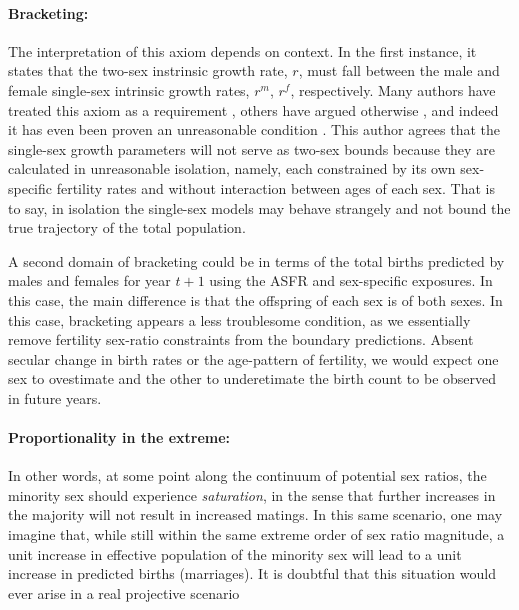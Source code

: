 \paragraph{Bracketing:} The interpretation of this axiom depends on context.
In the first instance, it states that the two-sex instrinsic growth rate, $r$,
must fall between the male and female single-sex intrinsic growth rates, $r^m$, $r^f$, 
respectively. Many authors have treated this axiom as a requirement
\citep{pollard1948measurement,
coale1972growth, gupta1976interactive, mitra1978derivation}, others have
argued otherwise \citep{gupta1973,schoen1981harmonic}, and indeed it has even
been proven an unreasonable condition \citep{yellin1977comparison}. This author
agrees that the single-sex growth parameters will not serve as two-sex bounds
because they are calculated in unreasonable isolation, namely, each constrained
by its own sex-specific fertility rates and without interaction between ages of
each sex. That is to say, in isolation the single-sex models may behave
strangely and not bound the true trajectory of the total population.

A second domain of bracketing could be in terms of the total births predicted by
males and females for year $t+1$ using the ASFR and sex-specific exposures. In
this case, the main difference is that the offspring of each sex is of both
sexes. In this case, bracketing appears a less troublesome condition, as we
essentially remove fertility sex-ratio constraints from the boundary
predictions. Absent secular change in birth rates or the age-pattern of fertility, 
we would expect one sex to ovestimate and the other to underetimate the birth count to be observed in
future years. 

\paragraph{Proportionality in the extreme:} In other words, at some point along
the continuum of potential sex ratios, the minority sex should experience
\textit{saturation}, in the sense that further increases in the majority will
not result in increased matings. In this same scenario, one may imagine that,
while still within the same extreme order of sex ratio magnitude, a unit
increase in effective population of the minority sex will lead to a unit
increase in predicted births (marriages). It is doubtful that this
situation would ever arise in a real projective scenario 
